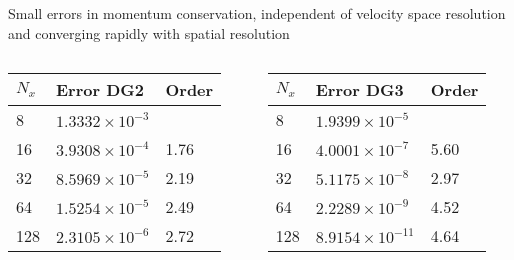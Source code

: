 \documentclass[pdf]{beamer}
\theoremstyle{definition}
\begin{document}
\begin{frame}{Small errors in momentum conservation, independent of
    velocity space resolution and converging rapidly with spatial
    resolution}%

  \begin{columns}
    \begin{column}{0.5\textwidth}
      \begin{tabulary}{\linewidth}{|L|L|L|}
        \hline
        
          $N_x$
        & {
          Error DG2
        } & {
          Order
        }\\
        & 
        $1.3332\times 10^{-3}$
        &  
        \\\hline
        
        16
        & 
        $3.9308\times 10^{-4}$
        & 
        1.76
        \\\hline
        
        32
        & 
        $8.5969\times 10^{-5}$
        & 
        2.19
        \\\hline
        
        64
        & 
        $1.5254\times 10^{-5}$
        & 
        2.49
        \\\hline
        
        128
        & 
        $2.3105\times 10^{-6}$
        & 
        2.72
        \\\hline
      \end{tabulary}
    \end{column}
    \begin{column}{0.5\textwidth}
      \begin{tabulary}{\linewidth}{|L|L|L|}
        \hline
        $N_x$
        & {
          Error DG3
        } & {
          Order
        }\\
        & 
        $1.9399\times 10^{-5}$
        &  
        \\\hline
        
        16
        & 
        $4.0001\times 10^{-7}$
        & 
        5.60
        \\\hline
        
        32
        & 
        $5.1175\times 10^{-8}$
        & 
        2.97
        \\\hline

        64
        & 
        $2.2289\times 10^{-9}$
        & 
        4.52
        \\\hline

        128
        & 
        $8.9154\times 10^{-11}$
        & 
        4.64
        \\\hline
      \end{tabulary}
    \end{column}
  \end{columns}

\end{frame}
\end{document}
